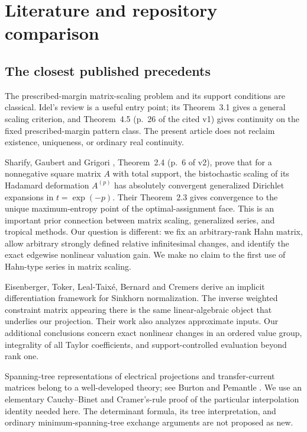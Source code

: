 \documentclass[11pt,a4paper]{article}
\numberwithin{equation}{section}
\theoremstyle{definition}
\begin{document}
\section{Literature and repository comparison}\label{scale:sec:comparison}

\subsection{The closest published precedents}
The prescribed-margin matrix-scaling problem and its support conditions
are classical. Idel's review \cite{Idel} is a useful entry point;
its Theorem~3.1 gives a general scaling criterion, and Theorem~4.5
(p.~26 of the cited v1) gives continuity on the fixed prescribed-margin
pattern class. The present article does not reclaim
existence, uniqueness, or ordinary real continuity.

Sharify, Gaubert and Grigori \cite{SGG}, Theorem~2.4 (p.~6 of v2),
prove that for a nonnegative square matrix $A$ with total support,
the bistochastic scaling of its Hadamard deformation $A^{(p)}$ has
absolutely convergent generalized Dirichlet expansions in $t=\exp(-p)$.
Their Theorem~2.3 gives convergence to the unique maximum-entropy point
of the optimal-assignment face.
This is an important prior connection between matrix scaling,
generalized series, and tropical methods. Our question is different:
we fix an arbitrary-rank Hahn matrix, allow arbitrary strongly defined
relative infinitesimal changes, and identify the exact edgewise
nonlinear valuation gain. We make no claim to the first use of Hahn-type
series in matrix scaling.

Eisenberger, Toker, Leal-Taix\'e, Bernard and Cremers \cite{Eisenberger}
derive an implicit differentiation framework for Sinkhorn normalization.
The inverse weighted constraint matrix appearing there is the same
linear-algebraic object that underlies our projection. Their work also
analyzes approximate inputs. Our additional conclusions concern exact
nonlinear changes in an ordered value group, integrality of all Taylor
coefficients, and support-controlled evaluation beyond rank one.

Spanning-tree representations of electrical projections and
transfer-current matrices belong to a well-developed theory; see
Burton and Pemantle \cite{BurtonPemantle}. We use an elementary
Cauchy--Binet and Cramer's-rule proof of the particular interpolation
identity needed here. The determinant formula, its tree interpretation,
and ordinary minimum-spanning-tree exchange arguments are not proposed
as new.
\end{document}
